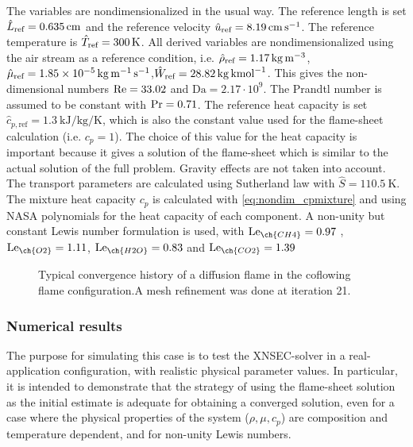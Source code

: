 The variables are nondimensionalized in the usual way. The reference length is set $\hat L_{\text{ref}} =  \SI{0.635}{\centi \meter}$ and the reference velocity $\hat u_{\text{ref}} =\SI{8.19}{\centi \meter \per \second}$. The reference temperature is $\hat T_{\text{ref}} =\SI{300}{K}$.  All derived variables are nondimensionalized using the air stream as a reference condition, i.e. $\hat \rho_{\text{ref}} = \SI{1.17}{\kilo \gram \per \cubic \meter}$, $\hat \mu_{\text{ref}} = \SI{1.85e-5}{\kilo \gram \per \meter \per \second}$,$\hat W_{\text{ref}} = \SI{28.82}{\kilo \gram \per \kilo\mole}$. This gives the non-dimensional numbers $\text{Re} = 33.02$ and $\text{Da} = 2.17\cdot 10^9$. The Prandtl number is assumed to be constant with $\text{Pr} = 0.71$. The reference heat capacity is set $\hat{c}_{p,\text{ref}}= \SI{1.3}{\kilo \joule \per \kilo \gram \per \kelvin}$, which is also the constant value used for the flame-sheet calculation (i.e. $c_p = 1$). The choice of this value for the heat capacity is important because it gives a solution of the flame-sheet which is similar to the actual solution of the full problem. Gravity effects are not taken into account. The transport parameters are calculated using Sutherland law with $\hat{S} = \SI{110.5}{\kelvin}$. The mixture heat capacity $c_p$ is calculated with \cref{eq:nondim_cpmixture} and using NASA polynomials for the heat capacity of each component. A non-unity but constant Lewis number formulation is used, with
$\Lewis_{\ch{CH4}} =  0.97 $ , $\Lewis_{\ch{O2}} = 1.11 $, $\Lewis_{\ch{H2O}} = 0.83 $ and $\Lewis_{\ch{CO2}} = 1.39 $ \citep{smookePremixedNonpremixedTest1991}
\begin{figure}[b!]
	\centering
	\caption{Typical convergence history of a diffusion flame in the coflowing flame configuration.A mesh refinement was done at iteration 21. }
	\label{fig:CoFlow_ConvergenceStory}
\end{figure}
\subsubsection{Numerical results}
The purpose for simulating this case is to test the XNSEC-solver in a real-application configuration, with realistic physical parameter values. In particular, it is intended to demonstrate that the strategy of using the flame-sheet solution as the initial estimate is adequate for obtaining a converged solution, even for a case where the physical properties of the system ($\rho, \mu, c_p$) are composition and temperature dependent, and for non-unity Lewis numbers. 

